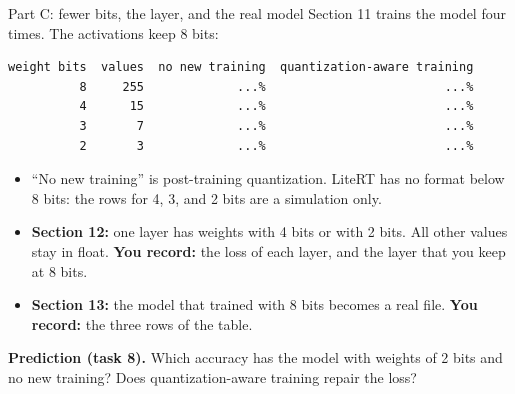 \begin{frame}[fragile]{Part C: fewer bits, the layer, and the real model}
  \small
  Section 11 trains the model four times. The activations keep 8 bits:
\begin{lstlisting}
weight bits  values  no new training  quantization-aware training
          8     255             ...%                         ...%
          4      15             ...%                         ...%
          3       7             ...%                         ...%
          2       3             ...%                         ...%
\end{lstlisting}
  \begin{itemize}
    \item ``No new training'' is post-training quantization. LiteRT has no
          format below 8 bits: the rows for 4, 3, and 2 bits are a
          simulation only.
    \item \textbf{Section 12:} one layer has weights with 4 bits or with 2
          bits. All other values stay in float. \textbf{You record:} the
          loss of each layer, and the layer that you keep at 8 bits.
    \item \textbf{Section 13:} the model that trained with 8 bits becomes a
          real  file. \textbf{You record:} the three rows of
          the table.
  \end{itemize}
  \begin{exerciseblock}
    \textbf{Prediction (task 8).} Which accuracy has the model with weights
    of 2 bits and no new training? Does quantization-aware training repair
    the loss?
  \end{exerciseblock}
\end{frame}

